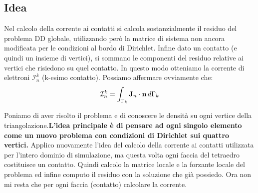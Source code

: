 %
%
%
%

\subsection{Idea}

Nel calcolo della corrente ai contatti si calcola sostanzialmente il residuo del problema DD globale, utilizzando per\`o la matrice di sistema non ancora modificata per le condizioni al bordo di Dirichlet. Infine dato un contatto (e quindi un insieme di vertici), si sommano le componenti del residuo relative ai vertici che risiedono su quel contatto. In questo modo otteniamo la corrente di elettroni $\mathcal{I}_n^k$ (k-esimo contatto). Possiamo affermare ovviamente che:
\begin{equation}
\mathcal{I}_n^k = \int_{\Gamma_k} \mathbf{J}_n \cdot \mathbf{n} \, d\Gamma_k
\end{equation}

Poniamo di aver risolto il problema e di conoscere le densit\`a su ogni vertice della triangolazione.\textbf{L'idea principale \`e di pensare ad ogni singolo elemento come un nuovo problema con condizioni di Dirichlet sui quattro vertici.} Applico nuovamente l'idea del calcolo della corrente ai contatti utilizzata per l'intero dominio di simulazione, ma questa volta ogni faccia del tetraedro costituisce un contatto. Quindi calcolo la matrice locale e la forzante locale del problema ed infine computo il residuo con la soluzione che gi\`a possiedo. Ora non mi resta che per ogni faccia (contatto) calcolare la corrente.


